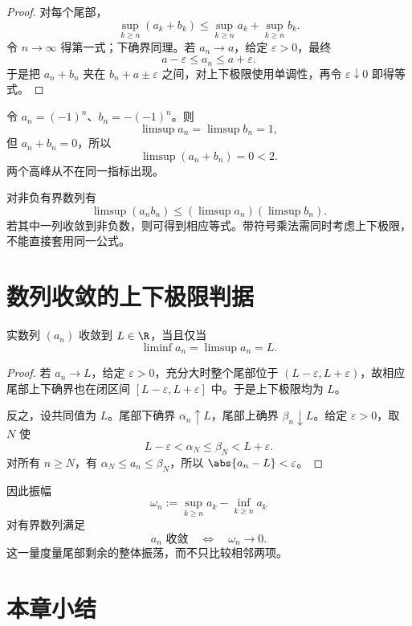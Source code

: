 \begin{proof}
对每个尾部，
\[
 \sup_{k\ge n}(a_k+b_k)
 \le\sup_{k\ge n}a_k+\sup_{k\ge n}b_k.
\]
令 \(n\to\infty\) 得第一式；下确界同理。若 \(a_n\to a\)，给定 \(\varepsilon>0\)，最终
\[
 a-\varepsilon\le a_n\le a+\varepsilon.
\]
于是把 \(a_n+b_n\) 夹在 \(b_n+a\pm\varepsilon\) 之间，对上下极限使用单调性，再令 \(\varepsilon\downarrow0\) 即得等式。
\end{proof}

\begin{counterexample}
令 \(a_n=(-1)^n\)、\(b_n=-(-1)^n\)。则
\[
 \limsup a_n=\limsup b_n=1,
\]
但 \(a_n+b_n=0\)，所以
\[
 \limsup(a_n+b_n)=0<2.
\]
两个高峰从不在同一指标出现。
\end{counterexample}

对非负有界数列有
\[
 \limsup(a_nb_n)\le(\limsup a_n)(\limsup b_n).
\]
若其中一列收敛到非负数，则可得到相应等式。带符号乘法需同时考虑上下极限，不能直接套用同一公式。

\section{数列收敛的上下极限判据}

\begin{theorem}
实数列 \((a_n)\) 收敛到 \(L\in\R\)，当且仅当
\[
 \liminf a_n=\limsup a_n=L.
\]
\end{theorem}

\begin{proof}
若 \(a_n\to L\)，给定 \(\varepsilon>0\)，充分大时整个尾部位于
\((L-\varepsilon,L+\varepsilon)\)，故相应尾部上下确界也在闭区间
\([L-\varepsilon,L+\varepsilon]\) 中。于是上下极限均为 \(L\)。

反之，设共同值为 \(L\)。尾部下确界 \(\alpha_n\uparrow L\)，尾部上确界 \(\beta_n\downarrow L\)。给定 \(\varepsilon>0\)，取 \(N\) 使
\[
 L-\varepsilon<\alpha_N\le\beta_N<L+\varepsilon.
\]
对所有 \(n\ge N\)，有
\(\alpha_N\le a_n\le\beta_N\)，所以 \(\abs{a_n-L}<\varepsilon\)。
\end{proof}

因此振幅
\[
 \omega_n:=\sup_{k\ge n}a_k-\inf_{k\ge n}a_k
\]
对有界数列满足
\[
 a_n\text{ 收敛}\quad\Longleftrightarrow\quad\omega_n\to0.
\]
这一量度量尾部剩余的整体振荡，而不只比较相邻两项。

\section*{本章小结}


